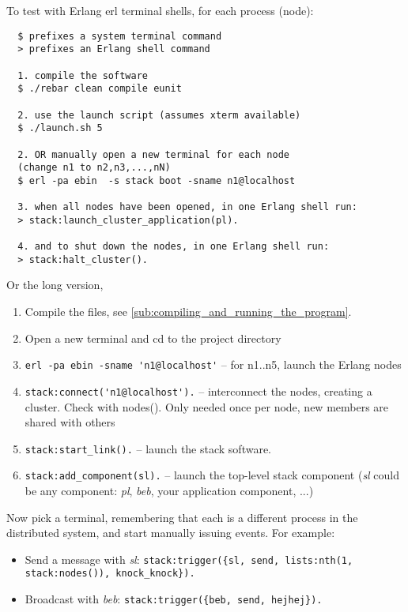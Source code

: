 \documentclass[a4paper]{article}
\begin{document}
To test with Erlang erl terminal shells, for each process (node):

\begin{verbatim}
  $ prefixes a system terminal command
  > prefixes an Erlang shell command

  1. compile the software
  $ ./rebar clean compile eunit

  2. use the launch script (assumes xterm available)
  $ ./launch.sh 5

  2. OR manually open a new terminal for each node
  (change n1 to n2,n3,...,nN)
  $ erl -pa ebin  -s stack boot -sname n1@localhost

  3. when all nodes have been opened, in one Erlang shell run:
  > stack:launch_cluster_application(pl).

  4. and to shut down the nodes, in one Erlang shell run:
  > stack:halt_cluster().
\end{verbatim}


Or the long version,

\begin{enumerate}

  \item Compile the files, see \ref{sub:compiling_and_running_the_program}.

  \item Open a new terminal and cd to the project directory

  \item \verb!erl -pa ebin -sname 'n1@localhost'! -- for n1..n5, launch the Erlang nodes

  \item \verb!stack:connect('n1@localhost').! -- interconnect the nodes, creating a cluster. Check with nodes(). Only needed once per node, new members are shared with others

  \item \verb!stack:start_link().! -- launch the stack software.

  \item \verb!stack:add_component(sl).! -- launch the top-level stack component (\emph{sl} could be any component: \emph{pl}, \emph{beb}, your application component, ...)

\end{enumerate}


Now pick a terminal, remembering that each is a different process in the
distributed system, and start manually issuing events. For example:

\begin{itemize}
  \item Send a message with \emph{sl}: \verb!stack:trigger({sl, send, lists:nth(1, stack:nodes()), knock_knock}).!
  \item Broadcast with \emph{beb}: \verb!stack:trigger({beb, send, hejhej}).!
\end{itemize}
\end{document}
